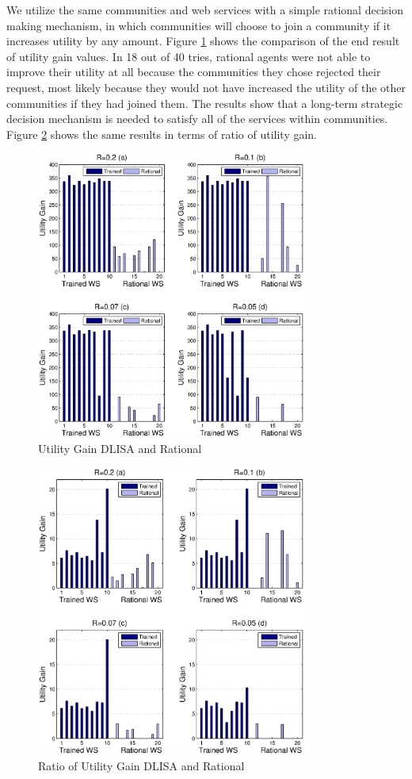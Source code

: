 \documentclass[10pt,journal,cspaper,compsoc]{IEEEtran}
\begin{document}
We utilize the same communities and web services with a simple rational decision making mechanism, in which communities will choose to join a community if it increases utility by any amount. Figure \ref{utility_gain_mlisa_and_rational} shows the comparison of the end result of utility gain values. In 18 out of 40 tries, rational agents were not able to improve their utility at all because the communities they chose rejected their request, most likely because they would not have increased the utility of the other communities if they had joined them. The results show that a long-term strategic decision mechanism is needed to satisfy all of the services within communities. Figure \ref{utility_gain_mlisa_and_rational_ratio} shows the same results in terms of ratio of utility gain.

\begin{figure}%
\centering
\includegraphics[width=3.5in]{figures/utility_gain.eps}
\caption{Utility Gain DLISA and Rational}
\label{utility_gain_mlisa_and_rational}
\end{figure}

\begin{figure}%
\centering
\includegraphics[width=3.5in]{figures/utility_ratio.eps}
\caption{Ratio of Utility Gain DLISA and Rational}
\label{utility_gain_mlisa_and_rational_ratio}
\end{figure}
\end{document}
